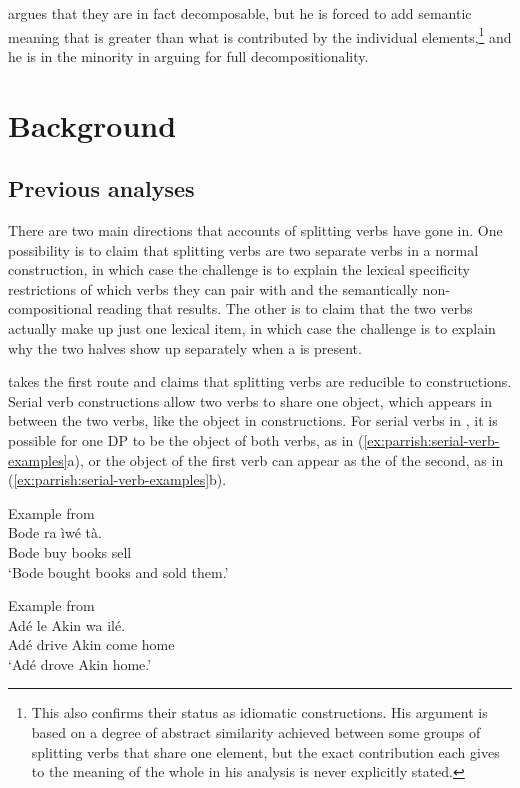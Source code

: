 \documentclass[output=paper,newtxmath,modfonts,nonflat,draftmode]{langsci/langscibook}
\begin{document}
\citet{Awoyale1974} argues that they are in fact decomposable, but he is forced to add semantic meaning that is greater than what is contributed by the individual elements,\footnote{This also confirms their status as idiomatic constructions. His argument is based on a degree of abstract similarity achieved between some groups of splitting verbs that share one element, but the exact contribution each gives to the meaning of the whole in his analysis is never explicitly stated.} and he is in the minority in arguing for full decompositionality. 



\section{Background}
\label{sect:background}
\subsection{Previous analyses}
\label{sect:yoruba}

There are two main directions that accounts of splitting verbs have gone in. One possibility is to claim that splitting verbs are two separate verbs in a normal  construction, in which case the challenge is to explain the lexical specificity restrictions of which verbs they can pair with and the semantically non-compositional reading that results. The other is to claim that the two verbs actually make up just one lexical item, in which case the challenge is to explain why the two halves show up separately when a  is present. 

\citet{Bamgbose1966} takes the first route and claims that splitting verbs are reducible to  constructions. Serial verb constructions allow two verbs to share one object, which appears in between the two verbs, like the object in  constructions. For serial verbs in , it is possible for one DP to be the object of both verbs, as in (\ref{ex:parrish:serial-verb-examples}a), or the object of the first verb can appear as the  of the second, as in (\ref{ex:parrish:serial-verb-examples}b). 


\ea
 \ea Example from \citet{Bode2007} \\
    \gll Bode ra ìwé tà.\\
    Bode buy books sell\\
    \glt `Bode bought books and sold them.'

    \ex Example from \citet{Sebba1987} \\
    \gll Adé le Akin wa ilé.\\
    Adé drive Akin come home\\
    \glt `Adé drove Akin home.'
 \z
 \label{ex:parrish:serial-verb-examples} 
\z
\end{document}
